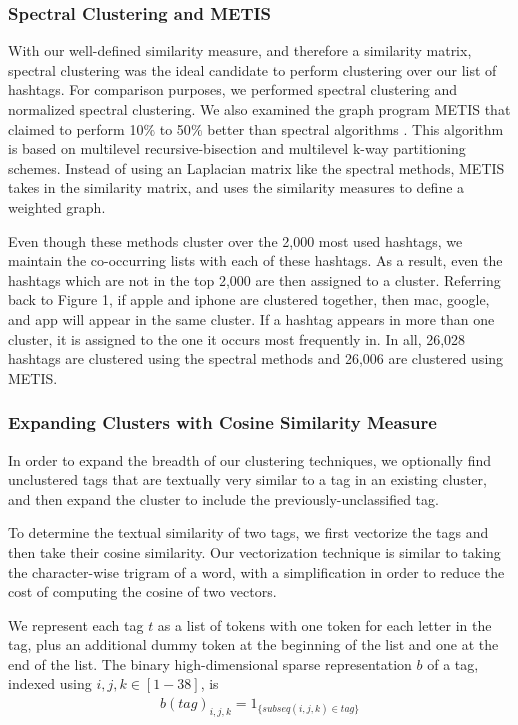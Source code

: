 \subsubsection{Spectral Clustering and METIS}
With our well-defined similarity measure, and therefore a similarity matrix, spectral clustering was the ideal candidate to perform clustering over our list of hashtags. For comparison purposes, we performed spectral clustering and normalized spectral clustering. We also examined the graph program METIS that claimed to perform 10$\%$ to 50$\%$ better than spectral algorithms \cite{Karypis1998}. This algorithm is based on multilevel recursive-bisection and multilevel k-way partitioning schemes. Instead of using an Laplacian matrix like the spectral methods, METIS takes in the similarity matrix, and uses the similarity measures to define a weighted graph.

Even though these methods cluster over the 2,000 most used hashtags, we maintain the co-occurring lists with each of these hashtags. As a result, even the hashtags which are not in the top 2,000 are then assigned to a cluster. Referring back to Figure 1, if apple and iphone are clustered together, then mac, google, and app will appear in the same cluster. If a hashtag appears in more than one cluster, it is assigned to the one it occurs most frequently in. In all, 26,028 hashtags are clustered using the spectral methods and 26,006 are clustered using METIS.

\subsubsection{Expanding Clusters with Cosine Similarity Measure}
In order to expand the breadth of our clustering techniques, we optionally find unclustered tags that are textually very similar to a tag in an existing cluster, and then expand the cluster to include the previously-unclassified tag.

To determine the textual similarity of two tags, we first vectorize the tags and then take their cosine similarity. Our vectorization technique is similar to taking the character-wise trigram of a word, with a simplification in order to reduce the cost of computing the cosine of two vectors.

We represent each tag $t$ as a list of tokens with one token for each letter in the tag, plus an additional dummy token at the beginning of the list and one at the end of the list. The binary high-dimensional sparse representation $b$ of a tag, indexed using $i, j, k \in [1-38]$, is
\begin{eqnarray}
b(tag)_{i,j,k} = 1_{\{subseq(i, j, k) \in tag\}} \nonumber
\end{eqnarray}

